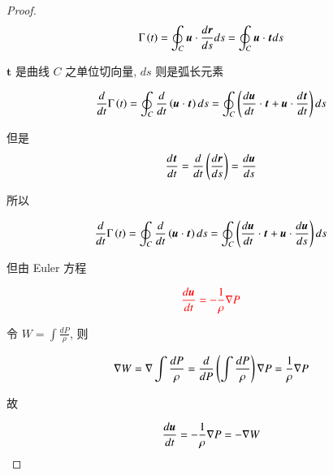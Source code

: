 \documentclass[11pt]{article}
\begin{document}
\begin{proof}
	
	\kaishu
	
	\begin{equation}
	\Gamma \left( t \right) = \oint_C {\boldsymbol{u} \cdot \frac{{d\boldsymbol{r}}}{{ds}}ds}  = \oint_C {\boldsymbol{u} \cdot \boldsymbol{t}ds}
	\notag 
	\end{equation}
	
	$ \boldsymbol{t} $ 是曲线 $ C $ 之单位切向量, $ ds  $ 则是弧长元素
	
	\begin{equation}
	\frac{d}{{dt}}\Gamma \left( t \right) = \oint_C {\frac{d}{{dt}}\left( {\boldsymbol{u} \cdot \boldsymbol{t}} \right)ds}  = \oint_C {\left( {\frac{{d\boldsymbol{u}}}{{dt}} \cdot \boldsymbol{t} + \boldsymbol{u} \cdot \frac{{d\boldsymbol{t}}}{{dt}}} \right)ds} 
	\notag 
	\end{equation}
	
	但是
	\begin{equation}
	\frac{{d\boldsymbol{t}}}{{dt}} = \frac{d}{{dt}}\left( {\frac{{d\boldsymbol{r}}}{{ds}}} \right) = \frac{{d\boldsymbol{u}}}{{ds}}
	\notag 
	\end{equation}
	
	所以
	
	\begin{equation}
	\frac{d}{{dt}}\Gamma \left( t \right) = \oint_C {\frac{d}{{dt}}\left( {\boldsymbol{u} \cdot \boldsymbol{t}} \right)ds}  = \oint_C {\left( {\frac{{d\boldsymbol{u}}}{{dt}} \cdot \boldsymbol{t} + \boldsymbol{u} \cdot \frac{{d\boldsymbol{u}}}{{ds}}} \right)ds} 
	\notag
	\end{equation}
	
	但由 Euler 方程
	
	\begin{equation}
	\color{red}
	\frac{{d\boldsymbol{u}}}{{dt}} =  - \frac{1}{\rho }\nabla P
	\notag 
	\end{equation}
	
	令 $W = \int {\frac{{dP}}{\rho }} $, 则
	
	\begin{equation}
	\nabla W = \nabla \int {\frac{{dP}}{\rho }}  = \frac{d}{{dP}}\left( {\int {\frac{{dP}}{\rho }} } \right)\nabla P = \frac{1}{\rho }\nabla P
	\notag 
	\end{equation}
	
	故
	
	\begin{equation}
	\frac{{d\boldsymbol{u}}}{{dt}} =  - \frac{1}{\rho }\nabla P =  - \nabla W
	\notag 
	\end{equation}
	

\end{proof}
\end{document}
